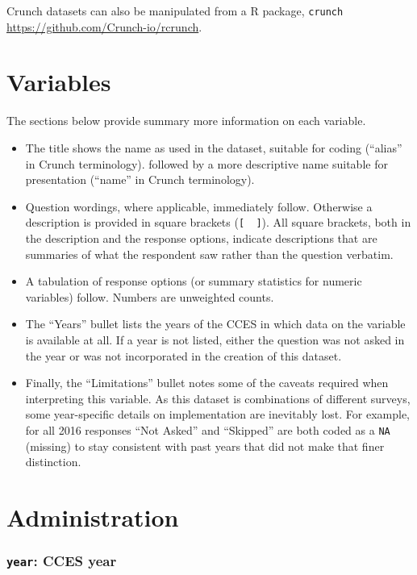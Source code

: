 \documentclass[10pt,article,oneside]{memoir}
\theoremstyle{definition}
\begin{document}
Crunch datasets can also be manipulated from a R package,
\texttt{crunch} \url{https://github.com/Crunch-io/rcrunch}.

\newpage

\section{Variables}\label{variables}

The sections below provide summary more information on each variable.

\begin{itemize}
\tightlist
\item
  The title shows the name as used in the dataset, suitable for coding
  (``alias'' in Crunch terminology). followed by a more descriptive name
  suitable for presentation (``name'' in Crunch terminology).
\item
  Question wordings, where applicable, immediately follow. Otherwise a
  description is provided in square brackets (\texttt{{[}\ \ {]}}). All
  square brackets, both in the description and the response options,
  indicate descriptions that are summaries of what the respondent saw
  rather than the question verbatim.
\item
  A tabulation of response options (or summary statistics for numeric
  variables) follow. Numbers are unweighted counts.
\item
  The ``Years'' bullet lists the years of the CCES in which data on the
  variable is available at all. If a year is not listed, either the
  question was not asked in the year or was not incorporated in the
  creation of this dataset.
\item
  Finally, the ``Limitations'' bullet notes some of the caveats required
  when interpreting this variable. As this dataset is combinations of
  different surveys, some year-specific details on implementation are
  inevitably lost. For example, for all 2016 responses ``Not Asked'' and
  ``Skipped'' are both coded as a \texttt{NA} (missing) to stay
  consistent with past years that did not make that finer distinction.
\end{itemize}

\section{Administration}\label{administration}

\subsubsection{\texorpdfstring{\texttt{year}: CCES
year}{year: CCES year}}\label{year-cces-year}
\end{document}
